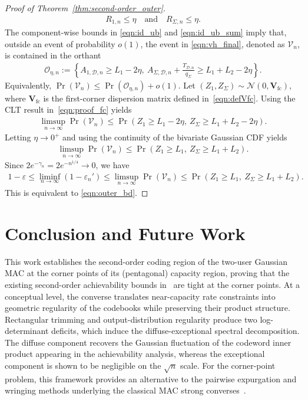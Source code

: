 \documentclass[11pt,onecolumn]{IEEEtran}
\newcommand{\calD}{\mathcal{D}}
\newcommand{\calN}{\mathcal{N}}
\newcommand{\calO}{\mathcal{O}}
\newcommand{\calV}{\mathcal{V}}
\newcommand{\bV}{\mathbf{V}}
\newcommand{\eps}{\varepsilon}
\begin{document}
\begin{proof}[Proof of Theorem~\ref{thm:second-order_outer}]
\begin{align}
    R_{1,n} \le \eta\quad\mbox{and}\quad R_{\Sigma,n} \le \eta.
\end{align}
The component-wise bounds in \eqref{eqn:id_ub} and \eqref{eqn:id_ub_sum} imply that, outside an event of probability $o(1)$, the event in \eqref{eqn:vh_final}, denoted as $\calV_n$, is contained in the orthant
\begin{align}
    \calO_{\eta,n}:=\left\{ A_{1,\calD,n}\ge L_1-2\eta, ~ A_{\Sigma,\calD,n} + \frac{T_{\calD,n}}{q_\Sigma}\ge L_1+L_2-2\eta\right\}.
\end{align}
Equivalently, $\Pr(\calV_n)\le\Pr(\calO_{\eta,n})+o(1)$. Let $(Z_1, Z_\Sigma)\sim\calN(0,\bV_{\mathrm{fc}})$, where $\bV_{\mathrm{fc}} $ is the first-corner dispersion matrix defined in~\eqref{eqn:defVfc}. Using  the CLT result in~\eqref{eqn:proof_fc} yields
\begin{align}
    \limsup_{n\to\infty}\Pr(\calV_n)\le \Pr( Z_1\ge L_1-2\eta,~Z_\Sigma\ge L_1+L_2-2\eta). 
\end{align}
Letting $\eta\to 0^+$ and using the continuity of the bivariate Gaussian CDF yields
\begin{align}
    \limsup_{n\to\infty}\Pr(\calV_n)\le \Pr( Z_1\ge L_1,~Z_\Sigma\ge L_1+L_2). 
\end{align}
Since $2e^{-\gamma_n}=2e^{-n^{1/4}}\to0$, we have 
\begin{align}
    1-\eps \le\liminf_{n\to\infty} (1-\eps_n')\le\limsup_{n\to\infty} \Pr( \calV_n)
     \le  \Pr( Z_1\ge L_1,~Z_\Sigma\ge L_1+L_2).
\end{align}
This is equivalent to \eqref{eqn:outer_bd}.
\end{proof}
\section{Conclusion and Future Work} \label{sec:concl}
This work establishes the second-order coding region of the two-user Gaussian MAC at the corner points of its (pentagonal) capacity region, proving that the existing second-order  achievability bounds in~\cite{yavas21,MolavianJaziLaneman2015,ScarlettMartinezGuillen2015} are tight at the corner points. At a conceptual level, the converse translates near-capacity rate constraints into geometric regularity of the codebooks while preserving their product structure. Rectangular trimming and output-distribution regularity produce two log-determinant deficits, which induce the diffuse-exceptional spectral decomposition. The diffuse component recovers the Gaussian fluctuation of the codeword inner product appearing in the achievability analysis, whereas the exceptional component is shown to be negligible on the $\sqrt n$ scale. For the corner-point problem, this framework provides an alternative to the pairwise expurgation and wringing methods underlying the classical MAC strong converses~\cite{Dueck1981StrongConverse,Ahlswede1982Elementary,fongtan16, Kosut2022Wringing, WeiKosut2021Wringing}.
\end{document}
